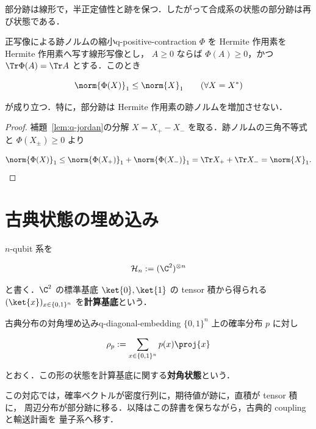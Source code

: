 部分跡は線形で，半正定値性と跡を保つ．したがって合成系の状態の部分跡は再び状態である．

\begin{lemma}{正写像による跡ノルムの縮小}{q-positive-contraction}
  $\Phi$ を Hermite 作用素を Hermite 作用素へ写す線形写像とし，
  $A\geq0$ ならば $\Phi(A)\geq0$，かつ $\Tr\Phi(A)=\Tr A$ とする．このとき

  \[
    \norm{\Phi(X)}_1\leq\norm{X}_1
    \qquad
    (\forall X=X^*)
  \]

  が成り立つ．特に，部分跡は Hermite 作用素の跡ノルムを増加させない．
\end{lemma}

\begin{proof}
  補題~\ref{lem:q-jordan}の分解 $X=X_+-X_-$ を取る．跡ノルムの三角不等式と
  $\Phi(X_\pm)\geq0$ より

  \[
    \norm{\Phi(X)}_1
    \leq\norm{\Phi(X_+)}_1+\norm{\Phi(X_-)}_1
    =\Tr X_++\Tr X_-
    =\norm{X}_1.
  \]
\end{proof}

\section{古典状態の埋め込み}

$n$-qubit 系を

\[
  \mathcal{H}_n:=(\C^2)^{\otimes n}
\]

と書く．$\C^2$ の標準基底 $\ket{0},\ket{1}$ の tensor 積から得られる
$(\ket{x})_{x\in\{0,1\}^n}$ を\textbf{計算基底}という．

\begin{definition}{古典分布の対角埋め込み}{q-diagonal-embedding}
  $\{0,1\}^n$ 上の確率分布 $p$ に対し

  \[
    \rho_p:=\sum_{x\in\{0,1\}^n}p(x)\proj{x}
  \]

  とおく．この形の状態を計算基底に関する\textbf{対角状態}という．
\end{definition}

この対応では，確率ベクトルが密度行列に，期待値が跡に，直積が tensor 積に，
周辺分布が部分跡に移る．以降はこの辞書を保ちながら，古典的 coupling と輸送計画を
量子系へ移す．
